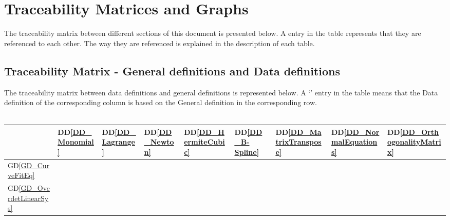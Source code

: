 \documentclass[12pt]{article}
\newcommand{\dref}[1]{GD\ref{#1}}
\newcommand{\ddref}[1]{DD\ref{#1}}
\begin{document}
\section{Traceability Matrices and Graphs}
The traceability matrix between different sections of this document is presented below. A \checkmark entry in the table represents that they are referenced to each other. The way they are referenced is explained in the description of each table.
\subsection{Traceability Matrix - General definitions and Data definitions}
The traceability matrix between data definitions and general definitions is represented below. A `\checkmark' entry in the table means that the Data definition of the corresponding column is based on the General definition in the corresponding row.\\
~\newline
\begin{tabular}{|p{1.3cm}|p{1cm}|p{1cm}|p{1cm}|p{1cm}|p{1cm}|p{1cm}|p{1cm}|p{1cm}|}
	
	\hline
	 & \ddref{DD_Monomial} & \ddref{DD_Lagrange} & \ddref{DD_Newton} & \ddref{DD_HermiteCubic} & \ddref{DD_B-Spline} & \ddref{DD_MatrixTranspose}  & \ddref{DD_NormalEquations} & \ddref{DD_OrthogonalityMatrix}\\
	 \hline
	 \dref{GD_CurveFitEq} & \checkmark & \checkmark  & \checkmark  & \checkmark  & \checkmark  & \checkmark   & \checkmark & \checkmark\\
	  \hline
	 \dref{GD_OverdetLinearSys} &  &   &   &   &   & \checkmark   & \checkmark & \checkmark \\
	 
	\hline
	
\end{tabular}\\
\end{document}

